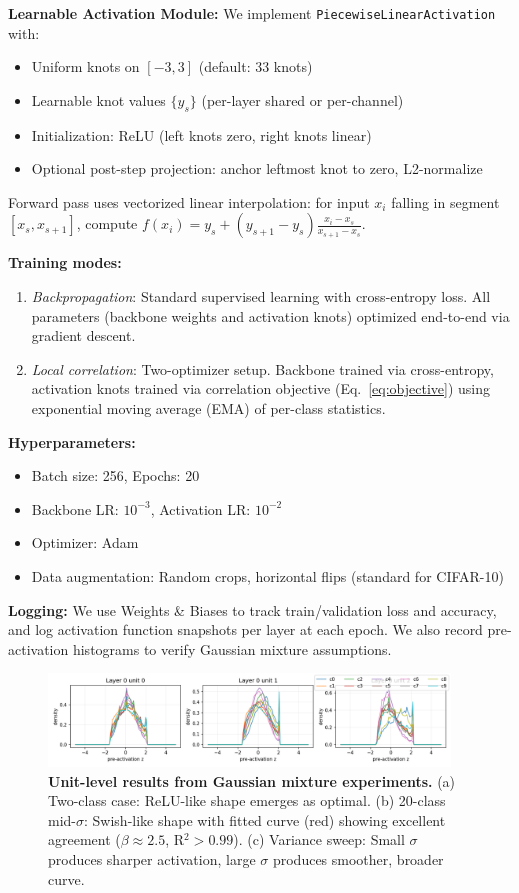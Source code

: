 \documentclass{article}
\begin{document}
\textbf{Learnable Activation Module:} We implement \texttt{PiecewiseLinearActivation} with:
\begin{itemize}
\item Uniform knots on $[-3, 3]$ (default: 33 knots)
\item Learnable knot values $\{y_s\}$ (per-layer shared or per-channel)
\item Initialization: ReLU (left knots zero, right knots linear)
\item Optional post-step projection: anchor leftmost knot to zero, L2-normalize
\end{itemize}

Forward pass uses vectorized linear interpolation: for input $x_i$ falling in segment $[x_s, x_{s+1}]$, compute $f(x_i) = y_s + (y_{s+1} - y_s) \frac{x_i - x_s}{x_{s+1} - x_s}$.

\textbf{Training modes:}
\begin{enumerate}
\item \textit{Backpropagation}: Standard supervised learning with cross-entropy loss. All parameters (backbone weights and activation knots) optimized end-to-end via gradient descent.
\item \textit{Local correlation}: Two-optimizer setup. Backbone trained via cross-entropy, activation knots trained via correlation objective (Eq.~\ref{eq:objective}) using exponential moving average (EMA) of per-class statistics.
\end{enumerate}

\textbf{Hyperparameters:}
\begin{itemize}
\item Batch size: 256, Epochs: 20
\item Backbone LR: $10^{-3}$, Activation LR: $10^{-2}$
\item Optimizer: Adam
\item Data augmentation: Random crops, horizontal flips (standard for CIFAR-10)
\end{itemize}

\textbf{Logging:} We use Weights \& Biases to track train/validation loss and accuracy, and log activation function snapshots per layer at each epoch. We also record pre-activation histograms to verify Gaussian mixture assumptions.

\begin{figure}[t]
\centering
\includegraphics[width=0.95\textwidth]{figures/fig6.png}
\caption{\textbf{Unit-level results from Gaussian mixture experiments.} (a) Two-class case: ReLU-like shape emerges as optimal. (b) 20-class mid-$\sigma$: Swish-like shape with fitted curve (red) showing excellent agreement ($\beta \approx 2.5$, R$^2 > 0.99$). (c) Variance sweep: Small $\sigma$ produces sharper activation, large $\sigma$ produces smoother, broader curve.}
\label{fig:unit_results}
\end{figure}
\end{document}
